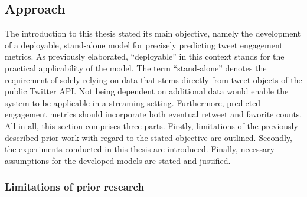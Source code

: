 \subsection{Approach}
\label{sec:approach}

The introduction to this thesis stated its main objective, namely the
development of a deployable, stand-alone model for precisely predicting tweet
engagement metrics.
As previously elaborated, ``deployable'' in this context stands for the practical
applicability of the model.
The term ``stand-alone'' denotes the requirement of solely relying
on data that stems directly from tweet objects of the public Twitter API.
Not being dependent on additional data would enable the system to be applicable
in a streaming setting.
Furthermore, predicted engagement metrics should incorporate both eventual
retweet and favorite counts.
All in all, this section comprises three parts.
Firstly, limitations of the previously described prior work with regard to the
stated objective are outlined.
Secondly, the experiments conducted in this thesis are introduced.
Finally, necessary assumptions for the developed models are stated and justified.

\subsubsection{Limitations of prior research}

